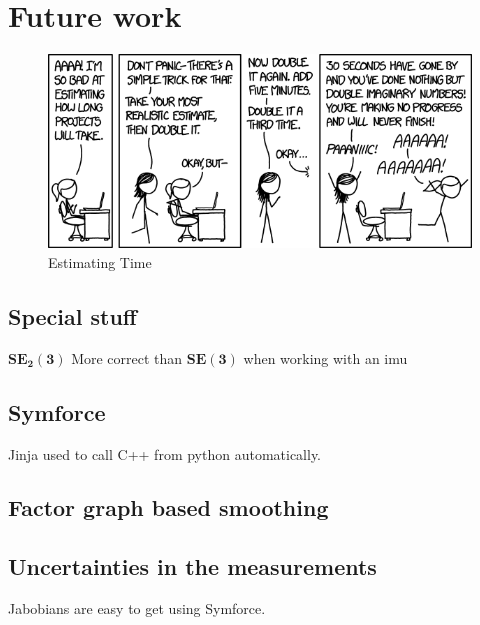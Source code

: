 \chapter{Future work}
\begin{figure}
    \centering
    \includegraphics[width=\textwidth]{figures/estimating_time.png}
    \caption{Estimating Time \cite{xkcdEstimatingTime2016}}
    \label{fig:xkcd_time}
\end{figure}


\section{Special stuff}
$\mathbf{SE_2(3)}$
More correct than $\mathbf{SE(3)}$ when working with an \gls{imu}

\section{Symforce}
Jinja used to call C++ from python automatically.

\section{Factor graph based smoothing}

\section{Uncertainties in the measurements}
Jabobians are easy to get using Symforce.

